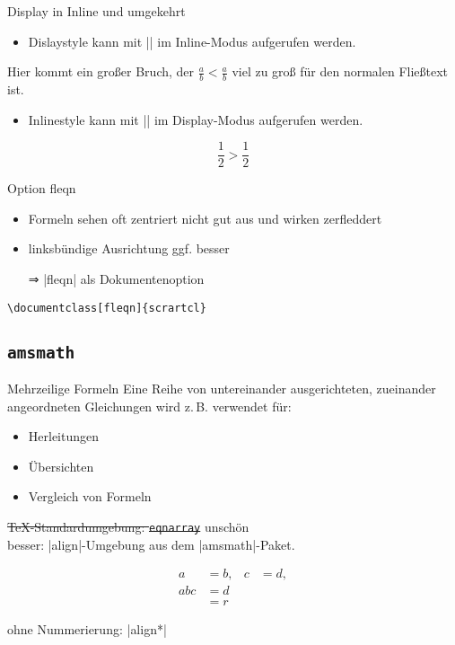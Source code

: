 \documentclass[
	vorläufig=false,
	datum=2022-11-09,
	titel={Mathematiksatz},
	web=false,
	max,
	aspectratio=1610,
]{../tex/latexkurs-slides}
\begin{document}
\begin{frame}[fragile]{Display in Inline und umgekehrt}
	\begin{itemize}
		\item Dislaystyle kann mit |\displaystyle| im Inline-Modus aufgerufen werden.
	\end{itemize}
\begin{LTXexample}[pos=b]
Hier kommt ein großer Bruch, der
$\frac{a}{b} < \displaystyle \frac{a}{b}$
viel zu groß für den normalen Fließtext ist.
\end{LTXexample}
	\begin{itemize}
		\item Inlinestyle kann mit |\textstyle| im Display-Modus aufgerufen werden.
	\end{itemize}
\begin{LTXexample}[pos=b]
\[\frac 12 > \textstyle \frac 12 \]
\end{LTXexample}
\end{frame}

\begin{frame}[fragile]{Option fleqn}
	\begin{itemize}
		\item Formeln sehen oft zentriert nicht gut aus und wirken zerfleddert
		\item linksbündige Ausrichtung ggf. besser
		\item[⇒] |fleqn| als Dokumentenoption 
	\end{itemize}
\begin{lstlisting}
\documentclass[fleqn]{scrartcl}
\end{lstlisting}
\end{frame}

\subsection{\texttt{amsmath}}
\begin{frame}[fragile]{Mehrzeilige Formeln}
	Eine Reihe von untereinander ausgerichteten, zueinander angeordneten Gleichungen wird z.\,B. verwendet für:
	\begin{itemize}
		\item Herleitungen
		\item Übersichten
		\item Vergleich von Formeln
	\end{itemize}
	\pause
	\sout{\TeX-Standardumgebung: \texttt{eqnarray}} \pause \alert{unschön}\\
	\alert{besser:} |align|-Umgebung aus dem |amsmath|-Paket.
	\pause
\begin{LTXexample}
\begin{align}
a &= b, &
c &= d,\\
abc &= d \\
&= r
\end{align}
\end{LTXexample}
	ohne Nummerierung: |{align*}|
\end{frame}
\end{document}
